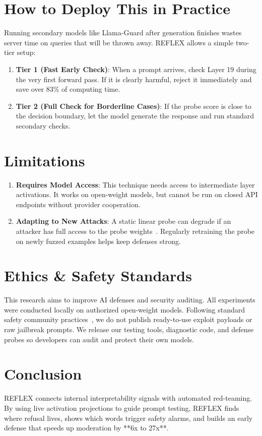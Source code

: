 \documentclass[manuscript,screen,review,anonymous]{acmart}
\begin{document}
\section{How to Deploy This in Practice}
Running secondary models like Llama-Guard after generation finishes wastes server time on queries that will be thrown away. REFLEX allows a simple two-tier setup:
\begin{enumerate}
    \item \textbf{Tier 1 (Fast Early Check)}: When a prompt arrives, check Layer 19 during the very first forward pass. If it is clearly harmful, reject it immediately and save over 83\% of computing time.
    \item \textbf{Tier 2 (Full Check for Borderline Cases)}: If the probe score is close to the decision boundary, let the model generate the response and run standard secondary checks.
\end{enumerate}

\section{Limitations}
\begin{enumerate}
    \item \textbf{Requires Model Access}: This technique needs access to intermediate layer activations. It works on open-weight models, but cannot be run on closed API endpoints without provider cooperation.
    \item \textbf{Adapting to New Attacks}: A static linear probe can degrade if an attacker has full access to the probe weights~\cite{nasr2025adaptive}. Regularly retraining the probe on newly fuzzed examples helps keep defenses strong.
\end{enumerate}

\section{Ethics \& Safety Standards}
This research aims to improve AI defenses and security auditing. All experiments were conducted locally on authorized open-weight models. Following standard safety community practices~\cite{mazeika2024harmbench,chao2024jailbreakbench}, we do not publish ready-to-use exploit payloads or raw jailbreak prompts. We release our testing tools, diagnostic code, and defense probes so developers can audit and protect their own models.

\section{Conclusion}
REFLEX connects internal interpretability signals with automated red-teaming. By using live activation projections to guide prompt testing, REFLEX finds where refusal lives, shows which words trigger safety alarms, and builds an early defense that speeds up moderation by **6x to 27x**.



\end{document}
